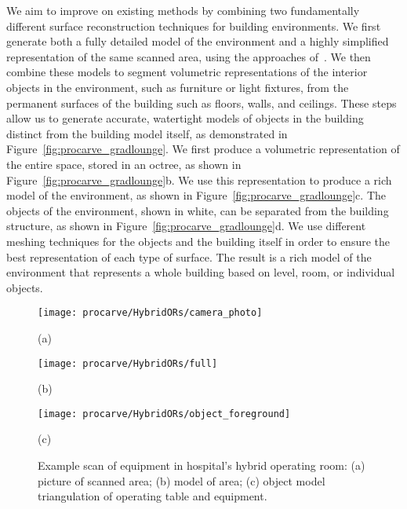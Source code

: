 \documentclass[12pt,onecolumn,oneside]{book}
\begin{document}
We aim to improve on existing methods by combining two fundamentally different surface reconstruction techniques for building environments.  We first generate both a fully detailed model of the environment and a highly simplified representation of the same scanned area, using the approaches of~\cite{Turner13,Turner14}.  We then combine these models to segment volumetric representations of the interior objects in the environment, such as furniture or light fixtures, from the permanent surfaces of the building such as floors, walls, and ceilings. These steps allow us to generate accurate, watertight models of objects in the building distinct from the building model itself, as demonstrated in Figure~\ref{fig:procarve_gradlounge}.  We first produce a volumetric representation of the entire space, stored in an octree, as shown in Figure~\ref{fig:procarve_gradlounge}b.  We use this representation to produce a rich model of the environment, as shown in Figure~\ref{fig:procarve_gradlounge}c.  The objects of the environment, shown in white, can be separated from the building structure, as shown in Figure~\ref{fig:procarve_gradlounge}d.  We use different meshing techniques for the objects and the building itself in order to ensure the best representation of each type of surface.  The result is a rich model of the environment that represents a whole building based on level, room, or individual objects.

\begin{figure}[t]

	\centering
	\begin{minipage}[t]{0.49\linewidth}
		\centerline{\texttt{[image: procarve/HybridORs/camera\_photo]}}
		\centerline{(a)}
	\end{minipage}
	\hfill
	\begin{minipage}[t]{0.49\linewidth}%
		\centerline{\texttt{[image: procarve/HybridORs/full]}}
		\centerline{(b)}
	\end{minipage}

	\begin{minipage}[t]{0.6\linewidth}
		\centerline{\texttt{[image: procarve/HybridORs/object\_foreground]}}
		\centerline{(c)}
	\end{minipage}

	\caption[Example scan of equipment in hospital operating room.]{Example scan of equipment in hospital's hybrid operating room: (a) picture of scanned area; (b) model of area; (c) object model triangulation of operating table and equipment.}
	\label{fig:procarve_hybrid}

\end{figure}
\end{document}

